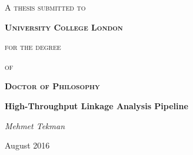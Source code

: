 \begin{titlepage}
	\centering
	{\scshape\Large A thesis submitted to\par}
	{\scshape\LARGE\bf University College London\par}
	{\scshape\Large for the degree\par}
	{\scshape\Large of\par}
	{\scshape\LARGE\bf Doctor of Philosophy\par}
	\vspace{1cm}

	\vspace{1.5cm}
	{\huge\bfseries High-Throughput Linkage Analysis Pipeline\par}
	\vspace{2cm}
	{\Large\itshape Mehmet Tekman\par}
	\vfill

	{\large August 2016 \par}

\end{titlepage}